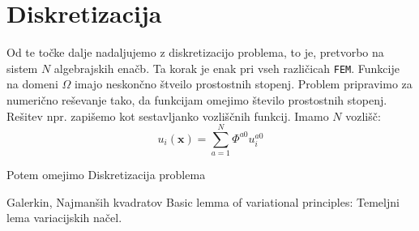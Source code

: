 \section{Diskretizacija}

Od te točke dalje nadaljujemo z diskretizacijo problema, to je, pretvorbo na sistem $N$ algebrajskih enačb. Ta korak je enak pri vseh različicah \texttt{FEM}. Funkcije na domeni $\Omega$ imajo neskončno štveilo prostostnih stopenj. Problem pripravimo za numerično reševanje tako, da funkcijam  omejimo število prostostnih stopenj. Rešitev npr. zapišemo kot sestavljanko vozliščnih funkcij. Imamo $N$ vozlišč:
\begin{equation}
    u_i(\mathbf{x}) = \sum_{a = 1}^N \Phi^{a0} u^{a0}_i
\end{equation}

Potem omejimo Diskretizacija problema 

Galerkin, Najmanših kvadratov \cite{JiangB-LSFEM}
Basic lemma of variational principles: Temeljni lema variacijskih načel.